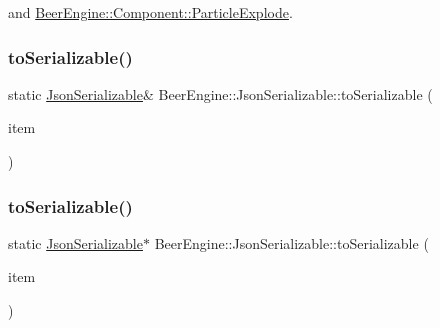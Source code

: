 and \mbox{\hyperlink{class_beer_engine_1_1_component_1_1_particle_explode_a194d098568efe69f8e8b62eec5863ae6}{Beer\+Engine\+::\+Component\+::\+Particle\+Explode}}.

\mbox{\label{class_beer_engine_1_1_json_serializable_a48f83f0e913d9a7f4962f30ac8ff450b}} 
\subsubsection{\texorpdfstring{to\+Serializable()}{toSerializable()}\hspace{0.1cm}{\footnotesize\ttfamily [1/2]}}
{\footnotesize\ttfamily static \mbox{\hyperlink{class_beer_engine_1_1_json_serializable}{Json\+Serializable}}\& Beer\+Engine\+::\+Json\+Serializable\+::to\+Serializable (\begin{DoxyParamCaption}\item[{\mbox{\hyperlink{class_beer_engine_1_1_json_serializable}{Json\+Serializable}} \&}]{item }\end{DoxyParamCaption})\hspace{0.3cm}{\ttfamily [static]}}

\mbox{\label{class_beer_engine_1_1_json_serializable_ae56f6be872da47edbb9a1f25a2eccc0e}} 
\subsubsection{\texorpdfstring{to\+Serializable()}{toSerializable()}\hspace{0.1cm}{\footnotesize\ttfamily [2/2]}}
{\footnotesize\ttfamily static \mbox{\hyperlink{class_beer_engine_1_1_json_serializable}{Json\+Serializable}}$\ast$ Beer\+Engine\+::\+Json\+Serializable\+::to\+Serializable (\begin{DoxyParamCaption}\item[{\mbox{\hyperlink{class_beer_engine_1_1_json_serializable}{Json\+Serializable}} $\ast$}]{item }\end{DoxyParamCaption})\hspace{0.3cm}{\ttfamily [static]}}


